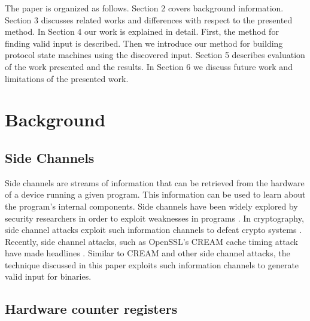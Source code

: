 \documentclass{acm_proc_article-sp}
\begin{document}
The paper is organized as follows.
Section 2 covers background information.
Section 3 discusses related works and differences with respect to the presented method.
In Section 4 our work is explained in detail. First, the method for finding valid input is described. Then we introduce our method for building protocol state machines using the discovered input.
Section 5 describes evaluation of the work presented and the results.
In Section 6 we discuss future work and limitations of the presented work.

\section{Background} \label{background}
 
\subsection{Side Channels} \label{bg_sidechannels}

Side channels are streams of information that can be retrieved from the hardware of a device running a given program.
This information can be used to learn about the program's internal components.
Side channels have been widely explored by security researchers in order to exploit weaknesses in programs \cite{weinbergside, schindler2002combined, genkin2014rsa, genkinstealing}.
In cryptography, side channel attacks exploit such information channels to defeat crypto systems \cite{zhou2005side, black2002black, okeya2006side}.
Recently, side channel attacks, such as OpenSSL's CREAM cache timing attack have made headlines \cite{}.
Similar to CREAM and other side channel attacks, the technique discussed in this paper exploits such information channels to generate valid input for binaries.

\subsection{Hardware counter registers} \label{bg_hardwarereg}
\end{document}
